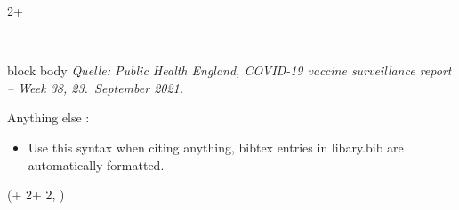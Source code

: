 \documentclass{beamer}
\newlength{\blockFour}
\begin{document}
\begin{frame}[t]
\begin{textblock*}{2\colwidth + \colsep}
\begin{parblock}{~}
\begin{beamercolorbox}[
    wd=0.92\linewidth,
    sep=0.35cm,
    left
]{block body}
    \vspace{0.1cm}
    \raggedleft
    \textit{Quelle: Public Health England,
    COVID-19 vaccine surveillance report -- Week 38,
    23.~September 2021.}

\end{beamercolorbox}

	\vspace{0.666667\baselineskip}\noindent%
	\alert{Anything else} :
	\begin{itemize}
		\setlength{\itemsep}{0pt}
		\item Use this syntax when citing anything, bibtex entries in libary.bib are automatically formatted.
	\end{itemize}

\end{parblock}

\end{textblock*}




\begin{textblock*}{\colwidth}(\leftmargin + 2\colwidth + 2\colsep, \blockFour)

\begin{parblock}{\textmd{\refname}}
	\vspace{-1.333333\baselineskip}  %
	\setlength{\bibhang}{0pt}
	\setlength{\bibsep}{0\baselineskip}
	\renewcommand*{\bibfont}{\sffamily\small\setlength{\baselineskip}{28.8pt}}
	\renewcommand*{\bf}{\bfseries}
	\begin{refcontext}[sorting = nyt]
	\printbibliography[heading = none]
	\end{refcontext}
	
\end{parblock}

\end{textblock*}

\end{frame}
\end{document}
